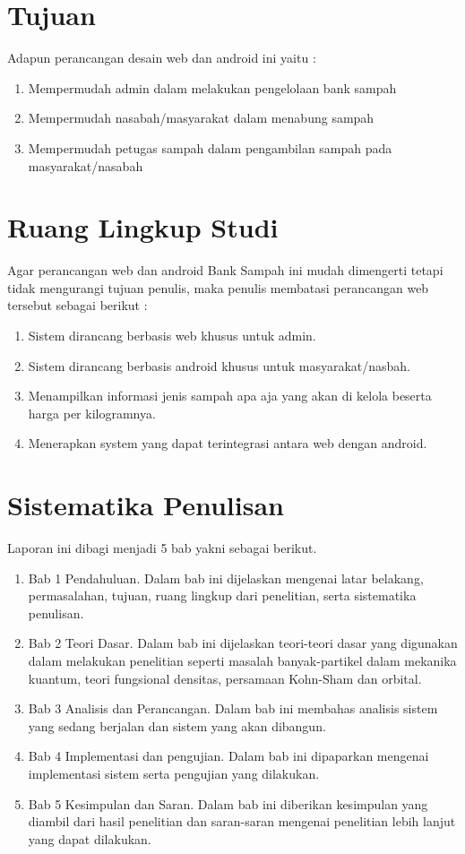 \section{Tujuan}
\label{sec:tujuan}
Adapun perancangan desain web dan android ini yaitu :
\begin{enumerate}
\item Mempermudah admin dalam melakukan pengelolaan bank sampah 
\item Mempermudah nasabah/masyarakat dalam menabung sampah
\item Mempermudah petugas sampah dalam pengambilan sampah pada masyarakat/nasabah
\end{enumerate}

\section{Ruang Lingkup Studi}
Agar perancangan web dan android Bank Sampah ini  mudah  dimengerti tetapi tidak mengurangi tujuan penulis, maka penulis membatasi perancangan web tersebut sebagai berikut :
\begin{enumerate}
\item Sistem dirancang berbasis web khusus untuk admin.
\item Sistem dirancang berbasis android khusus untuk masyarakat/nasbah.
\item Menampilkan informasi jenis sampah apa aja yang akan di kelola beserta harga per kilogramnya.
\item Menerapkan system yang dapat terintegrasi antara web dengan android.
\end{enumerate}

\section{Sistematika Penulisan}
Laporan ini dibagi menjadi 5 bab yakni sebagai berikut.
\begin{enumerate}
\item Bab 1 Pendahuluan. Dalam bab ini dijelaskan mengenai latar belakang, permasalahan, tujuan, ruang lingkup dari penelitian, serta sistematika penulisan.
\item Bab 2 Teori Dasar. Dalam bab ini dijelaskan teori-teori dasar yang digunakan dalam melakukan penelitian seperti masalah banyak-partikel dalam mekanika kuantum, teori fungsional densitas, persamaan Kohn-Sham dan orbital.
\item Bab 3 Analisis dan Perancangan. Dalam bab ini membahas analisis sistem yang sedang berjalan dan sistem yang akan dibangun.  
\item Bab 4 Implementasi dan pengujian. Dalam bab ini dipaparkan mengenai implementasi sistem serta pengujian yang dilakukan.  
\item Bab 5 Kesimpulan dan Saran. Dalam bab ini diberikan kesimpulan yang diambil dari hasil penelitian dan saran-saran mengenai penelitian lebih lanjut yang dapat dilakukan.
\end{enumerate}


